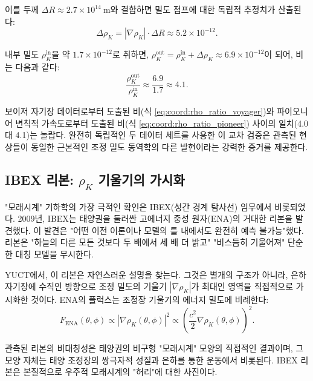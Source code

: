 \documentclass[11pt,a4paper]{article}
\theoremstyle{remark}
\begin{document}
	이를 두께 \(\Delta R \approx 2.7 \times 10^{14}\ \text{m}\)와 결합하면 밀도 점프에 대한 독립적 추정치가 산출된다:
	\begin{equation}
		\Delta \rho_K = |\nabla \rho_K| \cdot \Delta R \approx 5.2 \times 10^{-12}.
		\label{eq:coord:delta_rho_pioneer}
	\end{equation}
	
	내부 밀도 \(\rho_K^{\text{in}}\)을 약 \(1.7 \times 10^{-12}\)로 취하면, \(\rho_K^{\text{out}} = \rho_K^{\text{in}} + \Delta \rho_K \approx 6.9 \times 10^{-12}\)이 되어, 비는 다음과 같다:
	\begin{equation}
		\frac{\rho_K^{\text{out}}}{\rho_K^{\text{in}}} \approx \frac{6.9}{1.7} \approx 4.1.
		\label{eq:coord:rho_ratio_pioneer}
	\end{equation}
	
	보이저 자기장 데이터로부터 도출된 비(식 \eqref{eq:coord:rho_ratio_voyager})와 파이오니어 변칙적 가속도로부터 도출된 비(식 \eqref{eq:coord:rho_ratio_pioneer}) 사이의 일치(4.0 대 4.1)는 놀랍다. 완전히 독립적인 두 데이터 세트를 사용한 이 교차 검증은 관측된 현상들이 동일한 근본적인 조정 밀도 동역학의 다른 발현이라는 강력한 증거를 제공한다.
	
	\subsection{IBEX 리본: \(\rho_K\) 기울기의 가시화}
	\label{subsec:coord:ibex}
	
	"모래시계" 기하학의 가장 극적인 확인은 IBEX(성간 경계 탐사선) 임무에서 비롯되었다. 2009년, IBEX는 태양권을 둘러싼 고에너지 중성 원자(ENA)의 거대한 리본을 발견했다. 이 발견은 "어떤 이전 이론이나 모델의 틀 내에서도 완전히 예측 불가능"했다. 리본은 "하늘의 다른 모든 것보다 두 배에서 세 배 더 밝고" "비스듬히 기울어져" 단순한 대칭 모델을 무시한다.
	
	YUCT에서, 이 리본은 자연스러운 설명을 찾는다. 그것은 별개의 구조가 아니라, 은하 자기장에 수직인 방향으로 조정 밀도의 기울기 \(|\nabla \rho_K|\)가 최대인 영역을 직접적으로 가시화한 것이다. ENA의 플럭스는 조정장 기울기의 에너지 밀도에 비례한다:
	\begin{equation}
		F_{\text{ENA}}(\theta, \phi) \propto |\nabla \rho_K(\theta, \phi)|^2 \propto \left( \frac{c^2}{2} \nabla \rho_K(\theta, \phi) \right)^2.
		\label{eq:coord:ibex_flux}
	\end{equation}
	
	관측된 리본의 비대칭성은 태양권의 비구형 "모래시계" 모양의 직접적인 결과이며, 그 모양 자체는 태양 조정장의 쌍극자적 성질과 은하를 통한 운동에서 비롯된다. IBEX 리본은 본질적으로 우주적 모래시계의 "허리"에 대한 사진이다.
	
\end{document}
